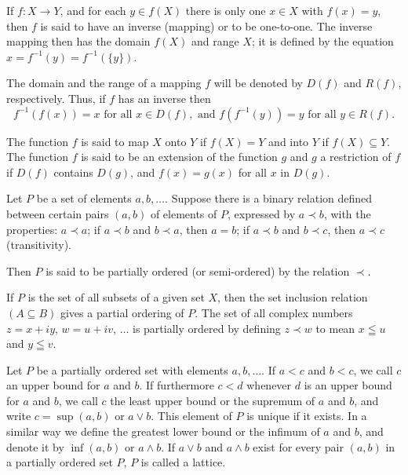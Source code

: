 If $f: X \to Y$, and for each $y \in f(X)$ there is only one $x \in X$ with $f(x) = y$, then $f$ is said to have an inverse (mapping) or to be one-to-one. The inverse mapping then has the domain $f(X)$ and range $X$; it is defined by the equation $x = f^{-1}(y) = f^{-1}(\{y\})$. 

The domain and the range of a mapping $f$ will be denoted by $D(f)$ and $R(f)$, respectively. Thus, if $f$ has an inverse then 
\[
f ^{-1} (f (x)) = x \text{ for all } x \in D (f), \text{ and } f (f ^{-1} (y)) = y \text{ for all } y \in R (f).
\]

The function $f$ is said to map $X$ onto $Y$ if $f(X) = Y$ and into $Y$ if $f(X) \subseteq Y$. The function $f$ is said to be an extension of the function $g$ and $g$ a restriction of $f$ if $D(f)$ contains $D(g)$, and $f(x) = g(x)$ for all $x$ in $D(g)$. 


\begin{definitionu} Let $P$ be a set of elements $a, b, \ldots$. Suppose there is a binary relation defined between certain pairs $(a, b)$ of elements of $P$, expressed by $a \prec b$, with the properties: 
$a\prec a$; if $a\prec b$ and $b\prec a$, then $a=b$; if $a\prec b$ and $b\prec c$, then $a\prec c$ (transitivity).
\end{definitionu}

Then $P$ is said to be partially ordered (or semi-ordered) by the relation $\prec$. 

\begin{examplen} If $P$ is the set of all subsets of a given set $X$, then the set inclusion relation $(A \subseteq B)$ gives a partial ordering of $P$. The set of all complex numbers $z = x + iy$, $w = u + iv$, $\ldots$ is partially ordered by defining $z \prec w$ to mean $x \leqq u$ and $y \leqq v$.

\end{examplen}
\begin{definitionu} Let $P$ be a partially ordered set with elements $a, b, \ldots$. If $a < c$ and $b < c$, we call $c$ an upper bound for $a$ and $b$. If furthermore $c < d$ whenever $d$ is an upper bound for $a$ and $b$, we call $c$ the least upper bound or the supremum of $a$ and $b$, and write $c = \sup (a, b)$ or $a \vee b$. This element of $P$ is unique if it exists. In a similar way we define the greatest lower bound or the infimum of $a$ and $b$, and denote it by $\inf (a, b)$ or $a \wedge b$. If $a \vee b$ and $a \wedge b$ exist for every pair $(a, b)$ in a partially ordered set $P$, $P$ is called a lattice. 
\end{definitionu}

